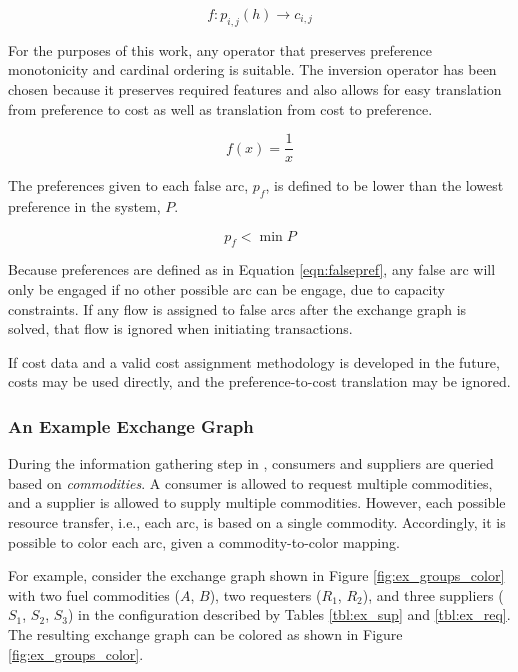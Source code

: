\begin{equation}
f : p_{i,j}(h) \to c_{i,j}
\end{equation}

\noindent
For the purposes of this work, any operator that preserves preference
monotonicity and cardinal ordering is suitable.  The inversion operator has been
chosen because it preserves required features and also allows for easy
translation from preference to cost as well as translation from cost to
preference.

\begin{equation}
f(x) = \frac{1}{x}
\end{equation}

The preferences given to each false arc, $p_f$, is defined to be lower than the
lowest preference in the system, $P$.

\begin{equation}\label{eqn:falsepref}
  p_{f} < \min P
\end{equation}

Because preferences are defined as in Equation \ref{eqn:falsepref}, any false
arc will only be engaged if no other possible arc can be engage, due to capacity
constraints. If any flow is assigned to false arcs after the exchange graph is
solved, that flow is ignored when initiating transactions.

If cost data and a valid cost assignment methodology is developed in the future,
costs may be used directly, and the preference-to-cost translation may be
ignored.

\subsubsection{An Example Exchange Graph}

During the information gathering step in , consumers and
suppliers are queried based on \textit{commodities}. A consumer is allowed to
request multiple commodities, and a supplier is allowed to supply multiple
commodities. However, each possible resource transfer, i.e., each arc, is based
on a single commodity. Accordingly, it is possible to color each arc, given a
commodity-to-color mapping.

For example, consider the exchange graph shown in Figure \ref{fig:ex_groups_color}
with two fuel commodities ($A$, $B$), two requesters ($R_1$, $R_2$), and three
suppliers ($S_1$, $S_2$, $S_3$) in the configuration described by Tables
\ref{tbl:ex_sup} and \ref{tbl:ex_req}. The resulting exchange graph can be
colored as shown in Figure \ref{fig:ex_groups_color}.

